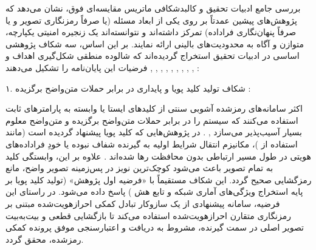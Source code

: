 


بررسی جامع ادبیات تحقیق و کالبدشکافی ماتریس مقایسه‌ای فوق، نشان می‌دهد که پژوهش‌های پیشین عمدتاً بر روی یکی از ابعاد مسئله (یا صرفاً رمزنگاری تصویر و یا صرفاً پنهان‌نگاری فراداده) تمرکز داشته‌اند و نتوانسته‌اند یک زنجیره امنیتی یکپارچه، متوازن و آگاه به محدودیت‌های بالینی ارائه نمایند. بر این اساس، سه شکاف پژوهشی اساسی  در ادبیات تحقیق استخراج گردیده‌اند که شالوده منطقی شکل‌گیری اهداف و فرضیات این پایان‌نامه را تشکیل می‌دهند , , , , , , , , , :\par



۱. شکاف تولید کلید پویا و پایداری در برابر حملات متن‌واضح برگزیده :\par

اکثر سامانه‌های رمزشده آشوبی سنتی از کلیدهای ایستا یا وابسته به پارامترهای ثابت استفاده می‌کنند که سیستم را در برابر حملات متن‌واضح برگزیده  و متن‌واضح معلوم  بسیار آسیب‌پذیر می‌سازد , . در پژوهش‌هایی که کلید پویا پیشنهاد گردیده است (مانند استفاده از )، مکانیزم انتقال شرایط اولیه به گیرنده شفاف نبوده یا خودِ فراداده‌های هویتی در طول مسیر ارتباطی بدون محافظت رها شده‌اند . علاوه بر این، وابستگی کلید به تمام تصویر باعث می‌شود کوچک‌ترین نویز در پس‌زمینه تصویر واضح، مانع رمزگشایی صحیح گردد. این شکاف مستقیماً با «فرضیه اول پژوهش» (تولید کلید پویا بر پایه استخراج ویژگی‌های آماری  شبکه  و تابع هش ) پاسخ داده می‌شود. در راستای این فرضیه، سامانه پیشنهادی از یک سازوکار تبادل کمکی احرازهویت‌شده  مبتنی بر رمزنگاری متقارن احرازهویت‌شده  استفاده می‌کند تا بازگشایی قطعی و بیت‌به‌بیت تصویر اصلی در سمت گیرنده، مشروط به دریافت و اعتبارسنجی موفق پرونده کمکی رمزشده، محقق گردد.\par



